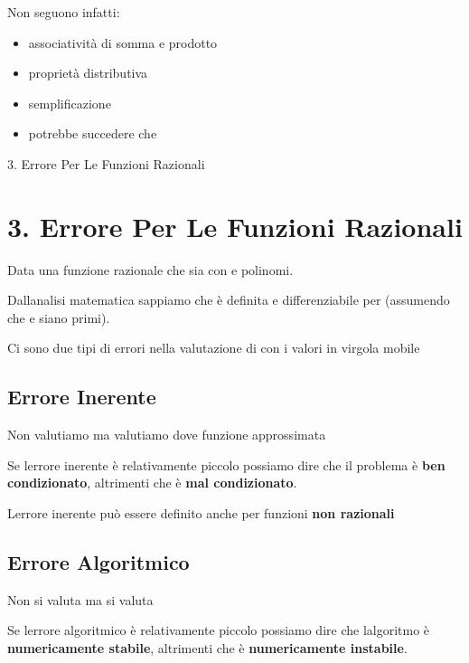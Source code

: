 \documentclass[
]{article}
\providecommand{\tightlist}{%
  \setlength{\itemsep}{0pt}\setlength{\parskip}{0pt}}
\begin{document}
Non seguono infatti:

\begin{itemize}
\tightlist
\item
  associatività di somma e prodotto
\item
  proprietà distributiva
\item
  semplificazione
\item
  potrebbe succedere che {}
\end{itemize}

3. Errore Per Le Funzioni Razionali

\hypertarget{errore-per-le-funzioni-razionali}{%
\section{3. Errore Per Le Funzioni
Razionali}\label{errore-per-le-funzioni-razionali}}

Data una funzione razionale {} che sia {} con {} e {} polinomi.

Dall\textquotesingle analisi matematica sappiamo che {} è definita e
differenziabile per {} (assumendo che {} e {} siano primi).

Ci sono due tipi di errori nella valutazione di {} con i valori in
virgola mobile

\hypertarget{errore-inerente}{%
\subsection{Errore Inerente}\label{errore-inerente}}

Non valutiamo {} ma valutiamo {} dove {} funzione approssimata

{}

Se l\textquotesingle errore inerente è relativamente piccolo possiamo
dire che il problema è \textbf{ben condizionato}, altrimenti che è
\textbf{mal condizionato}.

L\textquotesingle errore inerente può essere definito anche per funzioni
\textbf{non razionali}

\hypertarget{errore-algoritmico}{%
\subsection{Errore Algoritmico}\label{errore-algoritmico}}

Non si valuta {} ma si valuta {}

{}

Se l\textquotesingle errore algoritmico è relativamente piccolo possiamo
dire che l\textquotesingle algoritmo {} è \textbf{numericamente
stabile}, altrimenti che è \textbf{numericamente instabile}.
\end{document}
